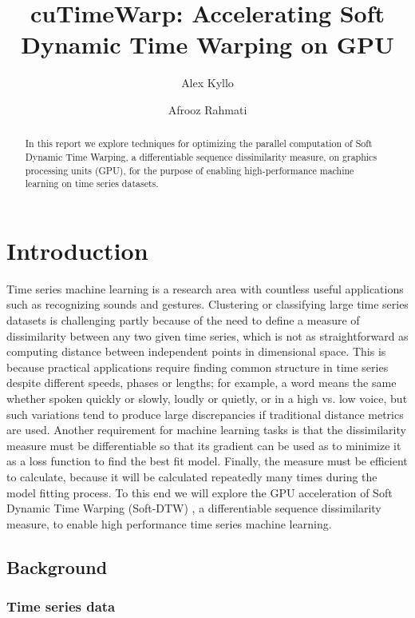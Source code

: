 \documentclass[12pt, letterpaper]{article}
\title{cuTimeWarp: Accelerating Soft Dynamic Time Warping on GPU}
\author{Alex Kyllo \and Afrooz Rahmati}
\begin{document}
\maketitle

\begin{abstract}

In this report we explore techniques for optimizing the parallel computation of
Soft Dynamic Time Warping, a differentiable sequence dissimilarity measure, on
graphics processing units (GPU), for the purpose of enabling high-performance
machine learning on time series datasets.

\end{abstract}

\section{Introduction}

Time series machine learning is a research area with countless useful
applications such as recognizing sounds and gestures. Clustering or classifying
large time series datasets is challenging partly because of the need to define a
measure of dissimilarity between any two given time series, which is not as
straightforward as computing distance between independent points in dimensional
space. This is because practical applications require finding common structure
in time series despite different speeds, phases or lengths; for example, a word
means the same whether spoken quickly or slowly, loudly or quietly, or in a high
vs. low voice, but such variations tend to produce large discrepancies if
traditional distance metrics are used. Another requirement for machine learning
tasks is that the dissimilarity measure must be differentiable so that its
gradient can be used as to minimize it as a loss function to find the best fit
model. Finally, the measure must be efficient to calculate, because it will be
calculated repeatedly many times during the model fitting process. To this end
we will explore the GPU acceleration of Soft Dynamic Time Warping (Soft-DTW)
\cite{cuturi_soft-dtw_2018}, a differentiable sequence dissimilarity measure, to
enable high performance time series machine learning.

\subsection{Background}

\subsubsection{Time series data}
\end{document}
